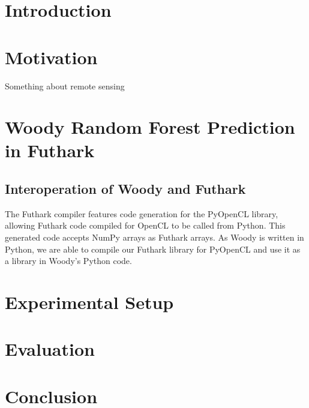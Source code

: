 \documentclass[a4paper]{article}
\begin{document}
\maketitle

\begin{abstract}
  
\end{abstract}

\section{Introduction}

\section{Motivation}

Something about remote sensing

\section{Woody Random Forest Prediction in Futhark}

\subsection{Interoperation of Woody and Futhark}

The Futhark compiler features code generation for the PyOpenCL library, allowing Futhark code compiled for OpenCL to be called from Python. This generated code accepts NumPy arrays as Futhark arrays. As Woody is written in Python, we are able to compile our Futhark library for PyOpenCL and use it as a library in Woody's Python code.

\section{Experimental Setup}

\section{Evaluation}

\section{Conclusion}
\end{document}
